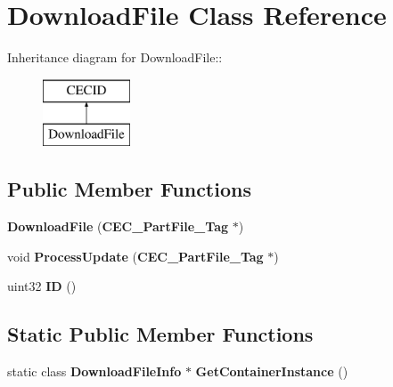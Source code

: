 \section{DownloadFile Class Reference}
\label{classDownloadFile}
Inheritance diagram for DownloadFile::\begin{figure}[H]
\begin{center}
\leavevmode
\includegraphics[height=2cm]{classDownloadFile}
\end{center}
\end{figure}
\subsection*{Public Member Functions}
\begin{DoxyCompactItemize}
\item 
{\bfseries DownloadFile} ({\bf CEC\_\-PartFile\_\-Tag} $\ast$)\label{classDownloadFile_a267900a8014565f03838688c6c07f59d}

\item 
void {\bfseries ProcessUpdate} ({\bf CEC\_\-PartFile\_\-Tag} $\ast$)\label{classDownloadFile_a50218ea644b4231387b9c577808ab49b}

\item 
uint32 {\bfseries ID} ()\label{classDownloadFile_add59dc673cb8f0a2456143e8a5c20f4f}

\end{DoxyCompactItemize}
\subsection*{Static Public Member Functions}
\begin{DoxyCompactItemize}
\item 
static class {\bf DownloadFileInfo} $\ast$ {\bfseries GetContainerInstance} ()\label{classDownloadFile_ac6d98be83f62b6a18d456aa64c0b15cf}

\end{DoxyCompactItemize}
